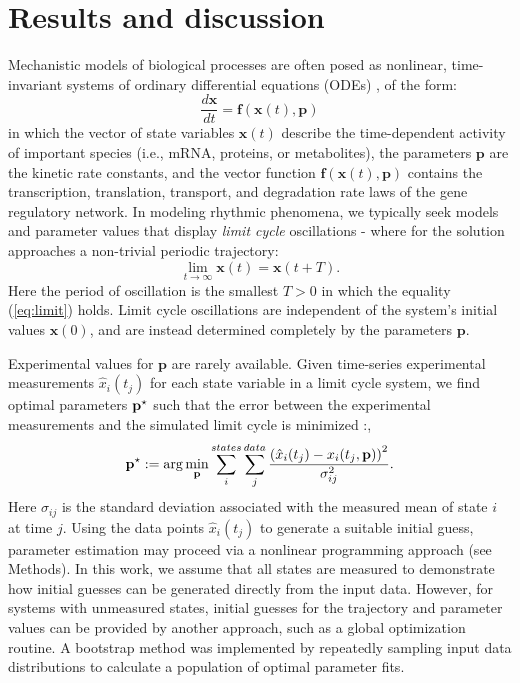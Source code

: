 \section{Results and discussion}
Mechanistic models of biological processes are often posed as
nonlinear, time-invariant systems of ordinary differential equations (ODEs)
\cite{Leloup2003, Forger2003, Mirsky2009}, of the form:
\begin{equation}
  \frac{d{\bm x}}{dt} = {\bm f}({\bm x}(t), {\bm p})
\end{equation}
in which the vector of state variables ${\bm x}(t)$ describe the time-dependent
activity of important species (i.e., mRNA, proteins, or metabolites), the
parameters $\bm p$ are the kinetic rate constants, and the vector function
${\bm f}({\bm x}(t), {\bm p})$ contains the transcription, translation,
transport, and degradation rate laws of the gene regulatory network. In
modeling rhythmic phenomena, we typically seek models and parameter values that
display {\itshape limit cycle} oscillations - where for the solution
approaches a non-trivial periodic trajectory:
\begin{equation} \label{eq:limit}
  \lim_{t \rightarrow \infty} {\bm x}(t) = {\bm x}(t + T).
\end{equation}
Here the period of oscillation is the smallest $T > 0$ in which the equality
(\ref{eq:limit}) holds. Limit cycle oscillations are independent of the
system's initial values ${\bm x}(0)$, and are instead determined completely by
the parameters $\bm p$. 

Experimental values for $\bm p$ are rarely available. Given time-series
experimental measurements $\hat{x}_i(t_j)$ for each state variable in a limit
cycle system, we find optimal parameters ${\mathbf{p}}^\star$ such that the error between
the experimental measurements and the simulated limit cycle is minimized
\cite{Bock2007}:,
\begin{equation} \label{eq:cost}
{\mathbf{p}}^\star := \arg\min_{\mathbf{p}} \sum_i^{states} \sum_j^{data}
\frac{\left(\hat{x}_i(t_j) - x_i(t_j,{\mathbf{p}})\right)^2}{ {\sigma}_{ij}^2}.
\end{equation}
Here ${\sigma}_{ij}$ is the standard deviation associated with the measured
mean of state $i$ at time $j$. Using the data points $\hat{x}_i(t_j)$ to
generate a suitable initial guess, parameter estimation may proceed via a
nonlinear programming approach (see Methods). In this work, we assume
that all states are measured to demonstrate how initial guesses can be
generated directly from the input data. However, for systems with unmeasured
states, initial guesses for the trajectory and parameter values can 
be provided by another approach, such as a global optimization routine. A
bootstrap method was implemented by repeatedly sampling input data
distributions to calculate a population of optimal parameter fits.

